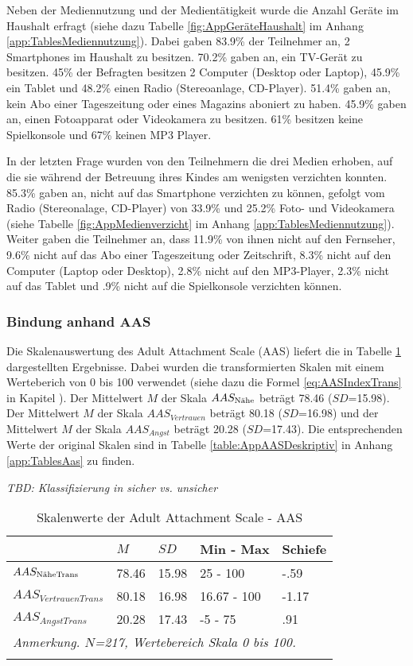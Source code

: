 Neben der Mediennutzung und der Medientätigkeit wurde die Anzahl Geräte im Haushalt erfragt (siehe dazu Tabelle \ref{fig:AppGeräteHaushalt} im Anhang \ref{app:TablesMediennutzung}). Dabei gaben 83.9\% der Teilnehmer an, 2 Smartphones im Haushalt zu besitzen. 70.2\% gaben an, ein TV-Gerät zu besitzen. 45\% der Befragten besitzen 2 Computer (Desktop oder Laptop), 45.9\% ein Tablet und 48.2\% einen Radio (Stereoanlage, CD-Player). 51.4\% gaben an, kein Abo einer Tageszeitung oder eines Magazins aboniert zu haben. 45.9\% gaben an, einen Fotoapparat oder Videokamera zu besitzen. 61\% besitzen keine Spielkonsole und 67\% keinen MP3 Player.

In der letzten Frage wurden von den Teilnehmern die drei Medien erhoben, auf die sie während der Betreuung ihres Kindes am wenigsten verzichten konnten. 85.3\% gaben an, nicht auf das Smartphone verzichten zu können, gefolgt vom Radio (Stereonalage, CD-Player) von 33.9\% und 25.2\% Foto- und Videokamera (siehe Tabelle \ref{fig:AppMedienverzicht} im Anhang \ref{app:TablesMediennutzung}). Weiter gaben die Teilnehmer an, dass 11.9\% von ihnen nicht auf den Fernseher, 9.6\% nicht auf das Abo einer Tageszeitung oder Zeitschrift, 8.3\% nicht auf den Computer (Laptop oder Desktop), 2.8\% nicht auf den MP3-Player, 2.3\% nicht auf das Tablet und .9\% nicht auf die Spielkonsole verzichten können.

\subsubsection{Bindung anhand AAS}
Die Skalenauswertung des Adult Attachment Scale (AAS) liefert die in Tabelle \ref{table:AASDeskriptiv} dargestellten Ergebnisse. Dabei wurden die transformierten Skalen mit einem Werteberich von 0 bis 100 verwendet (siehe dazu die Formel \ref{eq:AASIndexTrans} in Kapitel ). Der Mittelwert $M$ der Skala $AAS_{\textnormal{Nähe}}$ beträgt 78.46 ($SD$=15.98). Der Mittelwert $M$ der Skala $AAS_{Vertrauen}$ beträgt 80.18 ($SD$=16.98) und der Mittelwert  $M$ der Skala $AAS_{Angst}$ beträgt 20.28 ($SD$=17.43). Die entsprechenden Werte der original Skalen sind in Tabelle \ref{table:AppAASDeskriptiv} in Anhang \ref{app:TablesAas} zu finden.

\textit{TBD: Klassifizierung in sicher vs. unsicher}

\begin{table}%
\begin{tabular}{m{7em} m{3em}  m{3em}  m{5em} m{3em}} 
  \hline
  & $M$ & $SD$ & Min - Max & Schiefe\\
  \hline
  $AAS_{\textit{\textnormal{NäheTrans}}}$ & 78.46 & 15.98 & 25 - 100 & -.59\\
  $AAS_{VertrauenTrans}$ & 80.18 & 16.98 & 16.67 - 100 & -1.17\\
  $AAS_{AngstTrans}$ & 20.28 & 17.43 & -5 - 75 & .91 \\
  \hline
  \multicolumn{5}{l}{\textit{Anmerkung. $N$=217, Wertebereich Skala 0 bis 100.}}\\
  &&&&\\
\end{tabular}
\caption{Skalenwerte der Adult Attachment Scale - AAS}
\label{table:AASDeskriptiv}
\end{table}

